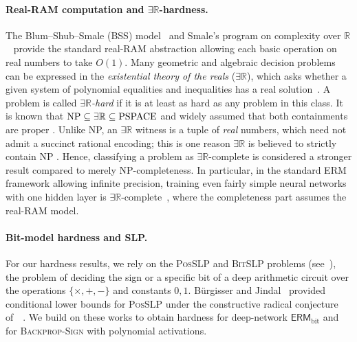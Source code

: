 \documentclass{article}
\theoremstyle{plain}
\theoremstyle{definition}
\theoremstyle{remark}
\begin{document}
\paragraph{Real-RAM computation and $\exists\mathbb{R}$-hardness.}
The Blum–Shub–Smale (BSS) model~\cite{blum1989theory} and Smale’s program on complexity over $\mathbb{R}$~\cite{smale1998mathematical} provide the standard real-RAM abstraction allowing each basic operation on real numbers to take $O(1)$. 
Many geometric and algebraic decision problems can be expressed in the \emph{existential theory of the reals} ($\exists\mathbb{R}$), which asks whether a given system of polynomial equalities and inequalities has a real solution~\cite{DBLP:conf/gd/Schaefer09}. 
A problem is called \emph{$\exists\mathbb{R}$-hard} if it is at least as hard as any problem in this class. It is known that $\textnormal{NP} \subseteq \exists \mathbb{R} \subseteq \textnormal{PSPACE}$ and widely assumed that both containments are proper \cite{canny1988some,schnider2023topological,schaefer2024existential}. Unlike NP, an $\exists\mathbb{R}$ witness is a tuple of \emph{real} numbers, which
need not admit a succinct rational encoding; this is one reason $\exists\mathbb{R}$
is believed to strictly contain NP \cite{DBLP:conf/gd/Schaefer09,schaefer2024existential}. Hence, classifying a problem as $\exists \mathbb{R}$-complete is considered a stronger result compared to merely NP-completeness. In particular,
in the standard ERM framework allowing infinite precision, training even fairly simple neural networks with one hidden layer is $\exists\mathbb{R}$-complete~\cite{NEURIPS2021_9813b270,BertschingerHJM23,hankala2024complexity}, where the completeness part assumes the real-RAM model.  

\paragraph{Bit-model hardness and SLP.}
For our hardness results, we rely on the \textsc{PosSLP} and \textsc{BitSLP} problems (see~\cite{DBLP:journals/siamcomp/AllenderBKM09, koiran2011interpolation,DBLP:conf/fsttcs/BlaserDJ24}), the problem of deciding the sign or a specific bit of a deep arithmetic circuit over the operations $\{\times,+,-\}$ and constants $0,1$. Bürgisser and Jindal~\cite{DBLP:conf/soda/BurgisserJ24} provided conditional lower bounds for \textsc{PosSLP} under the constructive radical conjecture of~~\cite{10.1145/3510359}. We build on these works to obtain hardness for deep-network $\mathsf{ERM}_{\text{bit}}$ and for \textsc{Backprop-Sign} with polynomial activations.
\end{document}
